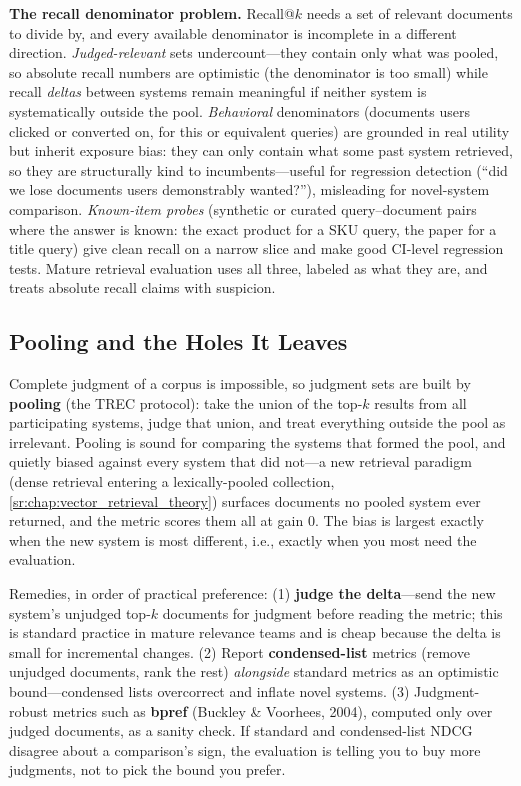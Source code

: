 \textbf{The recall denominator problem.} Recall@$k$ needs a set of relevant documents to divide by, and every available denominator is incomplete in a different direction. \textit{Judged-relevant} sets undercount---they contain only what was pooled, so absolute recall numbers are optimistic (the denominator is too small) while recall \textit{deltas} between systems remain meaningful if neither system is systematically outside the pool. \textit{Behavioral} denominators (documents users clicked or converted on, for this or equivalent queries) are grounded in real utility but inherit exposure bias: they can only contain what some past system retrieved, so they are structurally kind to incumbents---useful for regression detection (``did we lose documents users demonstrably wanted?''), misleading for novel-system comparison. \textit{Known-item probes} (synthetic or curated query--document pairs where the answer is known: the exact product for a SKU query, the paper for a title query) give clean recall on a narrow slice and make good CI-level regression tests. Mature retrieval evaluation uses all three, labeled as what they are, and treats absolute recall claims with suspicion.

\subsection{Pooling and the Holes It Leaves}

Complete judgment of a corpus is impossible, so judgment sets are built by \textbf{pooling} (the TREC protocol): take the union of the top-$k$ results from all participating systems, judge that union, and treat everything outside the pool as irrelevant. Pooling is sound for comparing the systems that formed the pool, and quietly biased against every system that did not---a new retrieval paradigm (dense retrieval entering a lexically-pooled collection, \ref{sr:chap:vector_retrieval_theory}) surfaces documents no pooled system ever returned, and the metric scores them all at gain 0. The bias is largest exactly when the new system is most different, i.e., exactly when you most need the evaluation.

Remedies, in order of practical preference: (1) \textbf{judge the delta}---send the new system's unjudged top-$k$ documents for judgment before reading the metric; this is standard practice in mature relevance teams and is cheap because the delta is small for incremental changes. (2) Report \textbf{condensed-list} metrics (remove unjudged documents, rank the rest) \textit{alongside} standard metrics as an optimistic bound---condensed lists overcorrect and inflate novel systems. (3) Judgment-robust metrics such as \textbf{bpref} (Buckley \& Voorhees, 2004), computed only over judged documents, as a sanity check. If standard and condensed-list NDCG disagree about a comparison's sign, the evaluation is telling you to buy more judgments, not to pick the bound you prefer.

